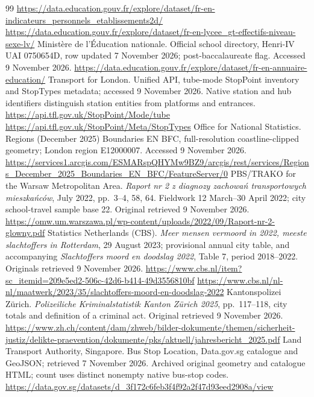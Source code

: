 \begin{thebibliography}{99}
\url{https://data.education.gouv.fr/explore/dataset/fr-en-indicateurs_personnels_etablissements2d/}
\url{https://data.education.gouv.fr/explore/dataset/fr-en-lycee_gt-effectifs-niveau-sexe-lv/}
 Minist\`ere de l'\'Education nationale. Official school directory, Henri-IV UAI 0750654D, row updated 7 November 2026; post-baccalaureate flag. Accessed 9 November 2026.
\url{https://data.education.gouv.fr/explore/dataset/fr-en-annuaire-education/}
 Transport for London. Unified API, tube-mode StopPoint inventory and StopTypes metadata; accessed 9 November 2026. Native station and hub identifiers distinguish station entities from platforms and entrances.
\url{https://api.tfl.gov.uk/StopPoint/Mode/tube}
\url{https://api.tfl.gov.uk/StopPoint/Meta/StopTypes}
 Office for National Statistics. Regions (December 2025) Boundaries EN BFC, full-resolution coastline-clipped geometry; London region E12000007. Accessed 9 November 2026.
\url{https://services1.arcgis.com/ESMARspQHYMw9BZ9/arcgis/rest/services/Regions_December_2025_Boundaries_EN_BFC/FeatureServer/0}
 PBS/TRAKO for the Warsaw Metropolitan Area. \textit{Raport nr 2 z diagnozy zachowa\'n transportowych mieszka\'nc\'ow}, July 2022, pp.~3--4, 58, 64. Fieldwork 12 March--30 April 2022; city school-travel sample base 22. Original retrieved 9 November 2026.
\url{https://omw.um.warszawa.pl/wp-content/uploads/2022/09/Raport-nr-2-glowny.pdf}
 Statistics Netherlands (CBS). \textit{Meer mensen vermoord in 2022, meeste slachtoffers in Rotterdam}, 29 August 2023; provisional annual city table, and accompanying \textit{Slachtoffers moord en doodslag 2022}, Table 7, period 2018--2022. Originals retrieved 9 November 2026.
\url{https://www.cbs.nl/item?sc_itemid=209e5ed2-506c-42d6-b414-49d3556810bf}
\url{https://www.cbs.nl/nl-nl/maatwerk/2023/35/slachtoffers-moord-en-doodslag-2022}
 Kantonspolizei Z\"urich. \textit{Polizeiliche Kriminalstatistik Kanton Z\"urich 2025}, pp.~117--118, city totals and definition of a criminal act. Original retrieved 9 November 2026.
\url{https://www.zh.ch/content/dam/zhweb/bilder-dokumente/themen/sicherheit-justiz/delikte-praevention/dokumente/pks/aktuell/jahresbericht_2025.pdf}
 Land Transport Authority, Singapore. Bus Stop Location,
Data.gov.sg catalogue and GeoJSON; retrieved 7 November 2026. Archived original
geometry and catalogue HTML; count uses distinct nonempty native bus-stop codes.
\url{https://data.gov.sg/datasets/d_3f172c6feb3f4f92a2f47d93eed2908a/view}

\end{thebibliography}
